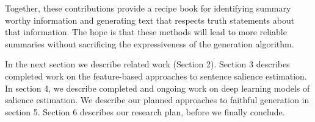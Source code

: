 
Together, these contributions
provide a recipe book for identifying summary worthy information and 
generating text that respects truth statements about that information.
The hope is that these methods will lead to more reliable summaries
without sacrificing the expressiveness of the generation algorithm. 

In the next section we describe related work (Section 2). Section 3 describes
completed work on the feature-based approaches to sentence salience estimation.
In section 4, we describe completed and ongoing work on deep learning models
of salience estimation. We describe our planned approaches to faithful 
generation in section 5. Section 6 describes our research plan, before 
we finally conclude.




